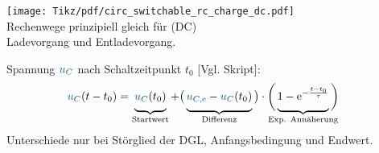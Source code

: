 {\begin{frame}[t]
\begin{minipage}{\textwidth}\centering%
\begin{minipage}[t][][t]{0.48\textwidth}\centering\vspace{0cm}%
    \texttt{[image: Tikz/pdf/circ\_switchable\_rc\_charge\_dc.pdf]}\\[1em]%
    {\flushleft%
    Rechenwege prinzipiell gleich für (DC) \\ Ladevorgang und Entladevorgang.%
    }%
\end{minipage}
\begin{minipage}[t][][t]{0.48\textwidth}\centering\vspace{0cm}%
\end{minipage}
\end{minipage}\hfill%
\begin{minipage}{\textwidth}\centering%
Spannung $\ecv{u_C}$ nach Schaltzeitpunkt $t_0$ [Vgl. Skript]:
\begin{align*}
    \ecv{u_C}(t-t_0) &= \underbrace{\ecv{u_C}(t_0) \vphantom{\Big|}}_{\text{Startwert}} + \big(\underbrace{\ecv{u_{C,\mathrm{e}}} - \ecv{u_C}(t_0) \vphantom{\Big|}}_{\text{Differenz}}\big) \cdot \bigg( \underbrace{ 1- \mathrm{e}^{-\frac{t-t_0}{\tau}} \vphantom{\Big|}}_{\text{\clap{Exp. Annäherung}}} \bigg)
\end{align*}
Unterschiede nur bei Störglied der DGL, Anfangsbedingung und Endwert.
\end{minipage}


\end{frame}}
